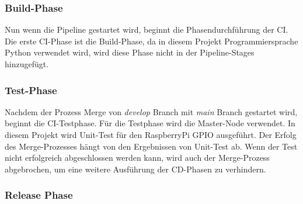 \subsubsection*{Build-Phase}

Nun wenn die Pipeline gestartet wird, beginnt die Phasendurchführung der \ac{CI}. Die erste \ac{CI}-Phase ist die Build-Phase, da in diesem Projekt Programmiersprache Python verwendet wird, wird diese Phase nicht in der Pipeline-Stages hinzugefügt.

\subsubsection*{Test-Phase}

Nachdem der Prozess Merge von \textit{develop} Branch mit \textit{main} Branch gestartet wird, beginnt die \ac{CI}-Testphase. Für die Testphase wird die Master-Node verwendet. In diesem Projekt wird Unit-Test für den RaspberryPi GPIO ausgeführt. Der Erfolg des Merge-Prozesses hängt von den Ergebnissen von Unit-Test ab. Wenn der Test nicht erfolgreich abgeschlossen werden kann, wird auch der Merge-Prozess abgebrochen, um eine weitere Ausführung der \ac{CD}-Phasen zu verhindern.

\subsubsection*{Release Phase}

